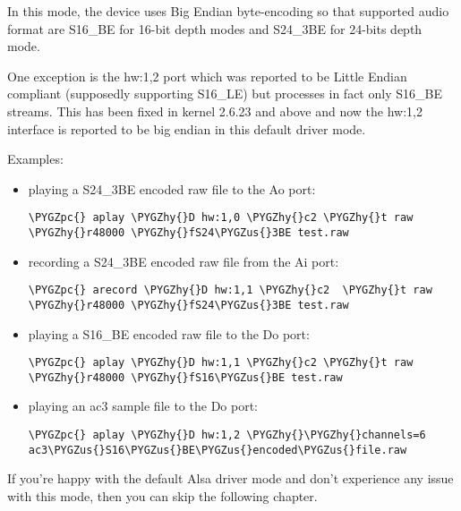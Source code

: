 \documentclass[a4paper,8pt,english]{sphinxmanual}
\def\PYGZus{\char`\_}
\def\PYGZpc{\char`\%}
\def\PYGZhy{\char`\-}
\begin{document}
In this mode, the device uses Big Endian byte-encoding so that
supported audio format are S16\_BE for 16-bit depth modes and S24\_3BE for
24-bits depth mode.

One exception is the hw:1,2 port which was reported to be Little Endian
compliant (supposedly supporting S16\_LE) but processes in fact only S16\_BE streams.
This has been fixed in kernel 2.6.23 and above and now the hw:1,2 interface
is reported to be big endian in this default driver mode.

Examples:
\begin{itemize}
\item {} 
playing a S24\_3BE encoded raw file to the Ao port:

\begin{Verbatim}[commandchars=\\\{\}]
\PYGZpc{} aplay \PYGZhy{}D hw:1,0 \PYGZhy{}c2 \PYGZhy{}t raw \PYGZhy{}r48000 \PYGZhy{}fS24\PYGZus{}3BE test.raw
\end{Verbatim}

\item {} 
recording a  S24\_3BE encoded raw file from the Ai port:

\begin{Verbatim}[commandchars=\\\{\}]
\PYGZpc{} arecord \PYGZhy{}D hw:1,1 \PYGZhy{}c2  \PYGZhy{}t raw \PYGZhy{}r48000 \PYGZhy{}fS24\PYGZus{}3BE test.raw
\end{Verbatim}

\item {} 
playing a S16\_BE encoded raw file to the Do port:

\begin{Verbatim}[commandchars=\\\{\}]
\PYGZpc{} aplay \PYGZhy{}D hw:1,1 \PYGZhy{}c2 \PYGZhy{}t raw \PYGZhy{}r48000 \PYGZhy{}fS16\PYGZus{}BE test.raw
\end{Verbatim}

\item {} 
playing an ac3 sample file to the Do port:

\begin{Verbatim}[commandchars=\\\{\}]
\PYGZpc{} aplay \PYGZhy{}D hw:1,2 \PYGZhy{}\PYGZhy{}channels=6 ac3\PYGZus{}S16\PYGZus{}BE\PYGZus{}encoded\PYGZus{}file.raw
\end{Verbatim}

\end{itemize}

If you're happy with the default Alsa driver mode and don't experience any
issue with this mode, then you can skip the following chapter.
\end{document}
